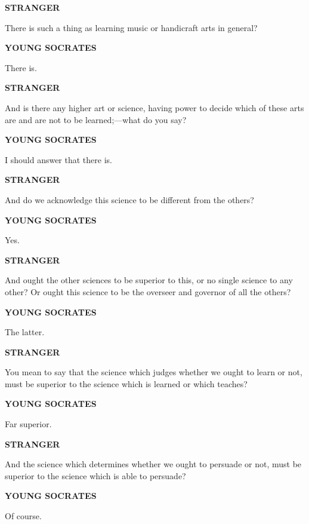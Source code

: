\documentclass[11pt,letter]{article}
\begin{document}
\par \textbf{STRANGER}
\par   There is such a thing as learning music or handicraft arts in general?

\par \textbf{YOUNG SOCRATES}
\par   There is.

\par \textbf{STRANGER}
\par   And is there any higher art or science, having power to decide which of these arts are and are not to be learned;—what do you say?

\par \textbf{YOUNG SOCRATES}
\par   I should answer that there is.

\par \textbf{STRANGER}
\par   And do we acknowledge this science to be different from the others?

\par \textbf{YOUNG SOCRATES}
\par   Yes.

\par \textbf{STRANGER}
\par   And ought the other sciences to be superior to this, or no single science to any other? Or ought this science to be the overseer and governor of all the others?

\par \textbf{YOUNG SOCRATES}
\par   The latter.

\par \textbf{STRANGER}
\par   You mean to say that the science which judges whether we ought to learn or not, must be superior to the science which is learned or which teaches?

\par \textbf{YOUNG SOCRATES}
\par   Far superior.

\par \textbf{STRANGER}
\par   And the science which determines whether we ought to persuade or not, must be superior to the science which is able to persuade?

\par \textbf{YOUNG SOCRATES}
\par   Of course.
\end{document}

